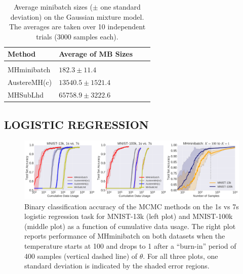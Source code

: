 \documentclass[letterpaper]{article}
\begin{document}
\begin{table}[t]
\caption{Average minibatch sizes ($\pm$ one standard deviation) on the Gaussian
mixture model. The averages are taken over 10 independent trials (3000 samples
each).}
\label{tab:gaussianres}
\vskip 0.15in
\begin{center}
\begin{tabular}{l l l l}
\textbf{Method} & \textbf{Average of MB Sizes} \\
\hline \\
{\sc MHminibatch}   & $182.3\pm 11.4$ \\
{\sc AustereMH(c)}  & $13540.5\pm 1521.4$ \\
{\sc MHSubLhd}      & $65758.9\pm 3222.6$ \\
\end{tabular}
\end{center}
\vskip -0.1in
\end{table}


\subsection{LOGISTIC REGRESSION}\label{ssec:logistic}

\begin{figure}[t]
	\centering
	\includegraphics[width=1.0\linewidth]{logistic_regression_error_regions.png}
	\caption{
    Binary classification accuracy of the MCMC methods on the 1s vs 7s logistic
    regression task for MNIST-13k (left plot) and MNIST-100k (middle plot) as a
    function of cumulative data usage.  The right plot reports performance of
    {\sc MHminibatch} on both datasets when the temperature starts at 100 and
    drops to 1 after a ``burn-in'' period of 400 samples (vertical dashed line)
    of $\theta$.  For all three plots, one standard deviation is indicated by
    the shaded error regions.
    }
	\label{fig:logistic_performance}
\end{figure}
\end{document}

